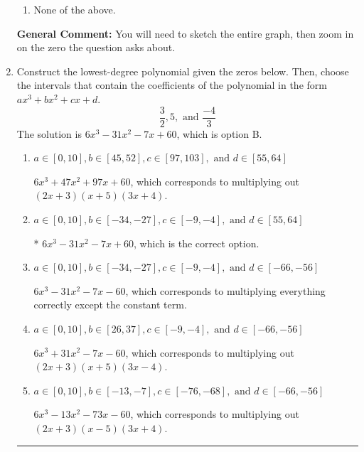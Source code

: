 \documentclass{extbook}[14pt]
\newcommand{\litem}[1]{\item #1

\rule{\textwidth}{0.4pt}}
\begin{document}
\begin{enumerate}
{\begin{enumerate}[label=\Alph*.]
\item None of the above.\end{enumerate}
\textbf{General Comment:} You will need to sketch the entire graph, then zoom in on the zero the question asks about.
}
\litem{
Construct the lowest-degree polynomial given the zeros below. Then, choose the intervals that contain the coefficients of the polynomial in the form $ax^3+bx^2+cx+d$.
\[ \frac{3}{2}, 5, \text{ and } \frac{-4}{3} \]The solution is \( 6x^{3} -31 x^{2} -7 x + 60 \), which is option B.\begin{enumerate}[label=\Alph*.]
\item \( a \in [0, 10], b \in [45, 52], c \in [97, 103], \text{ and } d \in [55, 64] \)

$6x^{3} +47 x^{2} +97 x + 60$, which corresponds to multiplying out $(2x + 3)(x + 5)(3x + 4)$.
\item \( a \in [0, 10], b \in [-34, -27], c \in [-9, -4], \text{ and } d \in [55, 64] \)

* $6x^{3} -31 x^{2} -7 x + 60$, which is the correct option.
\item \( a \in [0, 10], b \in [-34, -27], c \in [-9, -4], \text{ and } d \in [-66, -56] \)

$6x^{3} -31 x^{2} -7 x -60$, which corresponds to multiplying everything correctly except the constant term.
\item \( a \in [0, 10], b \in [26, 37], c \in [-9, -4], \text{ and } d \in [-66, -56] \)

$6x^{3} +31 x^{2} -7 x -60$, which corresponds to multiplying out $(2x + 3)(x + 5)(3x -4)$.
\item \( a \in [0, 10], b \in [-13, -7], c \in [-76, -68], \text{ and } d \in [-66, -56] \)

$6x^{3} -13 x^{2} -73 x -60$, which corresponds to multiplying out $(2x + 3)(x -5)(3x + 4)$.
\end{enumerate}

}
\end{enumerate}
\end{document}
